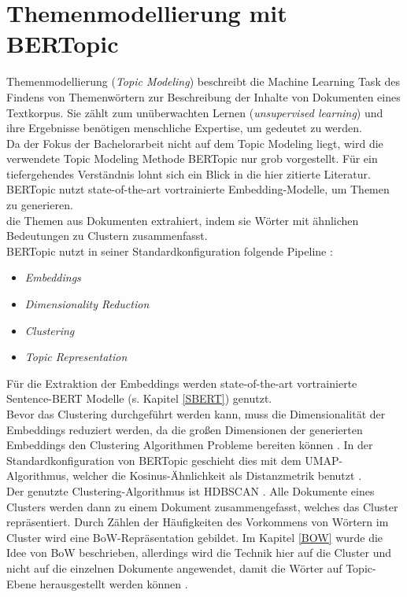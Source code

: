 \documentclass[ngerman]{ttlab-qualify}
\begin{document}
\section{Themenmodellierung mit BERTopic} \label{Grundlage_Topic_Modeling}
Themenmodellierung (\textit{Topic Modeling}) beschreibt die Machine Learning Task des Findens von Themenwörtern zur Beschreibung der Inhalte von Dokumenten eines Textkorpus. Sie zählt zum unüberwachten Lernen (\textit{unsupervised learning}) und ihre Ergebnisse benötigen menschliche Expertise, um gedeutet zu werden.\\
Da der Fokus der Bachelorarbeit nicht auf dem Topic Modeling liegt, wird die verwendete Topic Modeling Methode BERTopic nur grob vorgestellt. Für ein tiefergehendes Verständnis lohnt sich ein Blick in die hier zitierte Literatur.\\
BERTopic \parencite{bertopic} nutzt state-of-the-art vortrainierte Embedding-Modelle, um Themen zu generieren. \\
die Themen aus Dokumenten extrahiert, indem sie Wörter mit ähnlichen Bedeutungen zu Clustern zusammenfasst. \\
BERTopic nutzt in seiner Standardkonfiguration folgende Pipeline \parencite{bertopic}:
\begin{itemize}
\item \textit{Embeddings}
\item \textit{Dimensionality Reduction}
\item \textit{Clustering}
\item \textit{Topic Representation}
\end{itemize} 
Für die Extraktion der Embeddings werden state-of-the-art vortrainierte Sentence-BERT Modelle (s. Kapitel \ref{SBERT}) genutzt.\\
Bevor das Clustering durchgeführt werden kann, muss die Dimensionalität der Embeddings reduziert werden, da die großen Dimensionen der generierten Embeddings den Clustering Algorithmen Probleme bereiten können \parencite{bertopic}. In der Standardkonfiguration von BERTopic geschieht dies mit dem UMAP-Algorithmus, welcher die Kosinus-Ähnlichkeit als Distanzmetrik benutzt \parencite{UMAP}.\\ 
Der genutzte Clustering-Algorithmus ist HDBSCAN \parencite{HDBSCAN}.
Alle Dokumente eines Clusters werden dann zu einem Dokument zusammengefasst, welches das Cluster repräsentiert. Durch Zählen der Häufigkeiten des Vorkommens von Wörtern im Cluster wird eine BoW-Repräsentation gebildet. Im Kapitel \ref{BOW} wurde die Idee von BoW beschrieben, allerdings wird die Technik hier auf die Cluster und nicht auf die einzelnen Dokumente angewendet, damit die Wörter auf Topic-Ebene herausgestellt werden können \parencite{bertopic}.\\
\end{document}
